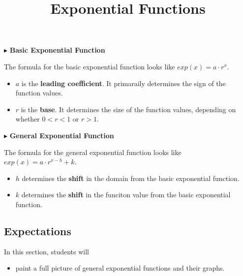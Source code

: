 \documentclass{ximera}
\title{Exponential Functions}
\begin{document}
\begin{abstract}
\end{abstract}
\maketitle



$\blacktriangleright$ \textbf{Basic Exponential Function}


The formula for the basic exponential function looks like $exp(x) = a \cdot r^x$. 

\begin{itemize}
\item $a$ is the \textbf{\textcolor{purple!85!blue}{leading coefficient}}.  It primaraily determines the sign of the function values.
\item $r$ is the \textbf{\textcolor{purple!85!blue}{base}}. It determines the size of the function values, depending on whether $0 < r < 1$ or $r > 1$.
\end{itemize}





$\blacktriangleright$ \textbf{General Exponential Function}

The formula for the general exponential function looks like $exp(x) = a \cdot r^{x - h} + k$. 

\begin{itemize}
\item $h$ determines the \textbf{\textcolor{purple!85!blue}{shift}} in the domain from the basic exponential function.  
\item $k$ determines the \textbf{\textcolor{purple!85!blue}{shift}} in the funciton value from the basic exponential function. 
\end{itemize}









\subsection{Expectations}


\begin{sectionOutcomes}
In this section, students will 

\begin{itemize}
\item paint a full picture of general exponential functions and their graphs.
\end{itemize}
\end{sectionOutcomes}
\end{document}
